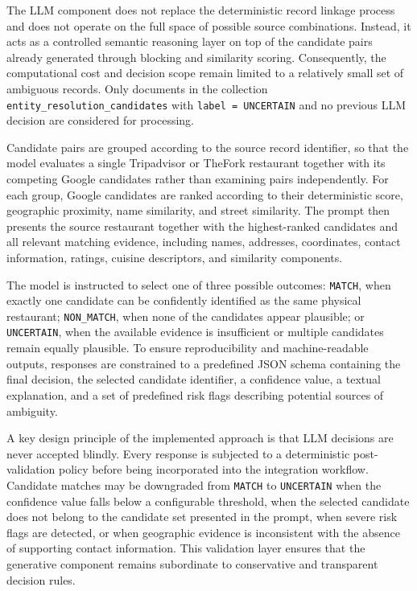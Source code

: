 The LLM component does not replace the deterministic record linkage process and does not operate on the full space of possible source combinations. Instead, it acts as a controlled semantic reasoning layer on top of the candidate pairs already generated through blocking and similarity scoring. Consequently, the computational cost and decision scope remain limited to a relatively small set of ambiguous records. Only documents in the collection \texttt{entity\_resolution\_candidates} with \texttt{label = UNCERTAIN} and no previous LLM decision are considered for processing.

Candidate pairs are grouped according to the source record identifier, so that the model evaluates a single Tripadvisor or TheFork restaurant together with its competing Google candidates rather than examining pairs independently. For each group, Google candidates are ranked according to their deterministic score, geographic proximity, name similarity, and street similarity. The prompt then presents the source restaurant together with the highest-ranked candidates and all relevant matching evidence, including names, addresses, coordinates, contact information, ratings, cuisine descriptors, and similarity components.

The model is instructed to select one of three possible outcomes: \texttt{MATCH}, when exactly one candidate can be confidently identified as the same physical restaurant; \texttt{NON\_MATCH}, when none of the candidates appear plausible; or \texttt{UNCERTAIN}, when the available evidence is insufficient or multiple candidates remain equally plausible. To ensure reproducibility and machine-readable outputs, responses are constrained to a predefined JSON schema containing the final decision, the selected candidate identifier, a confidence value, a textual explanation, and a set of predefined risk flags describing potential sources of ambiguity.

A key design principle of the implemented approach is that LLM decisions are never accepted blindly. Every response is subjected to a deterministic post-validation policy before being incorporated into the integration workflow. Candidate matches may be downgraded from \texttt{MATCH} to \texttt{UNCERTAIN} when the confidence value falls below a configurable threshold, when the selected candidate does not belong to the candidate set presented in the prompt, when severe risk flags are detected, or when geographic evidence is inconsistent with the absence of supporting contact information. This validation layer ensures that the generative component remains subordinate to conservative and transparent decision rules.

